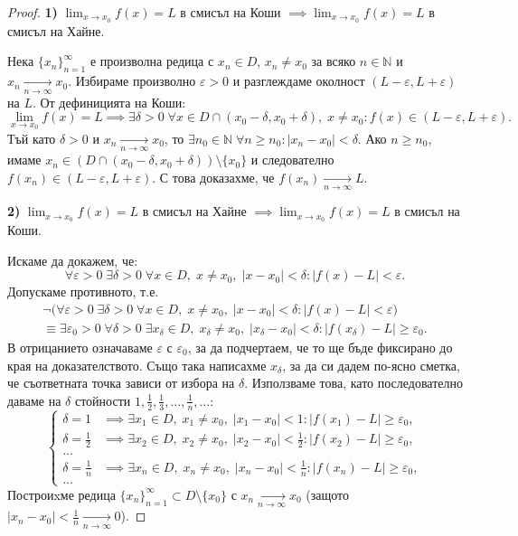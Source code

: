 \begin{proof}
\textbf{1)} $\lim_{x \to x_0} f(x) = L$ в смисъл на Коши $\implies \lim_{x \to x_0} f(x) = L$ в смисъл на Хайне.

Нека $\{x_n\}_{n=1}^{\infty}$ е произволна редица с $x_n \in D$, $x_n \neq x_0$ за всяко $n \in \mathbb{N}$ и $x_n \xrightarrow[n \to \infty]{} x_0$. Избираме произволно $\varepsilon > 0$ и разглеждаме околност $(L - \varepsilon, L + \varepsilon)$ на $L$. От дефиницията на Коши:
\[
\lim_{x \to x_0} f(x) = L \implies \exists \delta > 0 \; \forall x \in D \cap (x_0 - \delta, x_0 + \delta), \; x \neq x_0 : f(x) \in (L - \varepsilon, L + \varepsilon).
\]
Тъй като $\delta > 0$ и $x_n \xrightarrow[n \to \infty]{} x_0$, то $\exists n_0 \in \mathbb{N} \; \forall n \ge n_0 : |x_n - x_0| < \delta$. Ако $n \ge n_0$, имаме $x_n \in (D \cap (x_0 - \delta, x_0 + \delta)) \setminus \{x_0\}$ и следователно $f(x_n) \in (L - \varepsilon, L + \varepsilon)$. С това доказахме, че $f(x_n) \xrightarrow[n \to \infty]{} L$.

\medskip
\textbf{2)} $\lim_{x \to x_0} f(x) = L$ в смисъл на Хайне $\implies \lim_{x \to x_0} f(x) = L$ в смисъл на Коши.

Искаме да докажем, че:
\[
\forall \varepsilon > 0 \; \exists \delta > 0 \; \forall x \in D, \; x \neq x_0, \; |x - x_0| < \delta : |f(x) - L| < \varepsilon.
\]
Допускаме противното, т.е.
\begin{align*}
\neg \big( \forall \varepsilon > 0 \; \exists \delta > 0 \; \forall x \in D, \; x \neq x_0, \; |x - x_0| < \delta : |f(x) - L| < \varepsilon \big) \\
\equiv \exists \varepsilon_0 > 0 \; \forall \delta > 0 \; \exists x_\delta \in D, \; x_\delta \neq x_0, \; |x_\delta - x_0| < \delta : |f(x_\delta) - L| \ge \varepsilon_0.
\end{align*}
В отрицанието означаваме $\varepsilon$ с $\varepsilon_0$, за да подчертаем, че то ще бъде фиксирано до края на доказателството. Също така написахме $x_\delta$, за да си дадем по-ясно сметка, че съответната точка зависи от избора на $\delta$. Използваме това, като последователно даваме на $\delta$ стойности $1, \frac{1}{2}, \frac{1}{3}, \dots, \frac{1}{n}, \dots$:
\[
\begin{cases}
\delta = 1 &\implies \exists x_1 \in D, \; x_1 \neq x_0, \; |x_1 - x_0| < 1 : |f(x_1) - L| \ge \varepsilon_0, \\
\delta = \frac{1}{2} &\implies \exists x_2 \in D, \; x_2 \neq x_0, \; |x_2 - x_0| < \frac{1}{2} : |f(x_2) - L| \ge \varepsilon_0, \\
\dots \\
\delta = \frac{1}{n} &\implies \exists x_n \in D, \; x_n \neq x_0, \; |x_n - x_0| < \frac{1}{n} : |f(x_n) - L| \ge \varepsilon_0, \\
\dots
\end{cases}
\]
Построиxме редица $\{x_n\}_{n=1}^{\infty} \subset D \setminus \{x_0\}$ с $x_n \xrightarrow[n \to \infty]{} x_0$ (защото $|x_n - x_0| < \frac{1}{n} \xrightarrow[n \to \infty]{} 0$).


\end{proof}
